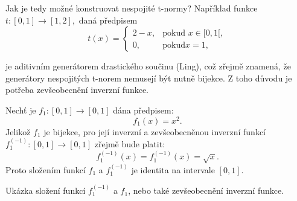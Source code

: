 Jak je tedy možné konstruovat nespojité t-normy? Například funkce $t: [0,1] \rightarrow [1,2],$ daná předpisem $$t(x)= \begin{cases} 2-x, & \mbox {pokud }x \in [0,1[,
    \\ 0, & \mbox {pokud} x = 1,
    \end{cases}$$
    
    je aditivním generátorem drastického součinu (Ling), což zřejmě znamená, že generátory nespojitých t-norem nemusejí být nutně bijekce. Z toho d\r uvodu je potřeba zevšeobecnění inverzní funkce.
\begin{example}
\cite{KMP}
    Nech\v t je  $f_1:[0,1] \rightarrow [0,1]$  dána předpisem:
    $$f_1(x)=x^2.$$
    Jelikož $f_1$ je bijekce, pro její inverzní a zevšeobecněnou inverzní funkcí
    \newline$f_1^{(-1)}:[0,1] \rightarrow [0,1]$ zřejmě bude platit:
    $$f_1^{(-1)}(x)=f_1^{(-1)}(x)= \sqrt{x}.$$
    Proto složením funkcí $f_1$ a $f_1^{(-1)}$ je
    identita na intervale $[0,1].$
\end{example} 
\begin{graph} Ukázka složení funkcí $f_1^{(-1)} $ a $ f_1$, nebo také zevšeobecnění inverzní funkce.\\

\end{graph}




